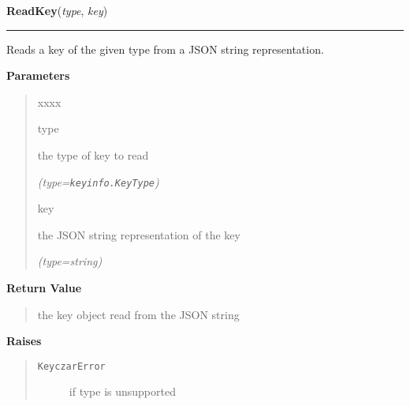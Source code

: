     \label{keyczar:keys:ReadKey}

    \vspace{0.5ex}

\hspace{.8\funcindent}\begin{boxedminipage}{\funcwidth}

    \raggedright \textbf{ReadKey}(\textit{type}, \textit{key})

    \vspace{-1.5ex}

    \rule{\textwidth}{0.5\fboxrule}
\setlength{\parskip}{2ex}
    Reads a key of the given type from a JSON string representation.

\setlength{\parskip}{1ex}
      \textbf{Parameters}
      \vspace{-1ex}

      \begin{quote}
        \begin{Ventry}{xxxx}

          \item[type]

          the type of key to read

            {\it (type=\texttt{keyinfo.KeyType})}

          \item[key]

          the JSON string representation of the key

            {\it (type=string)}

        \end{Ventry}

      \end{quote}

      \textbf{Return Value}
    \vspace{-1ex}

      \begin{quote}
      the key object read from the JSON string

      \end{quote}

      \textbf{Raises}
    \vspace{-1ex}

      \begin{quote}
        \begin{description}

          \item[\texttt{KeyczarError}]

          if type is unsupported

        \end{description}

      \end{quote}

    \end{boxedminipage}


